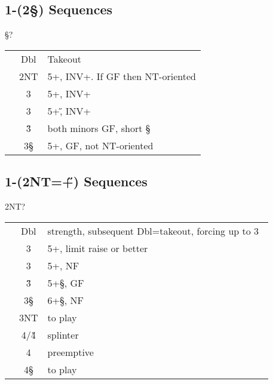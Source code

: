 \subsection{1\D-(2\S) Sequences}

\begin{bidding}
\>\D{}\S\>?
\end{bidding}

\begin{longtable}{C{\linklength} C{\bidlength} l}
& Dbl & Takeout \\
& 2NT & 5+\C, INV+. If GF then NT-oriented \\
& 3\C & 5+\D, INV+ \\
& 3\D & 5+\H, INV+ \\
& 3\H & both minors GF, short \S \\
& 3\S & 5+\C, GF, not NT-oriented \\
\end{longtable}

\subsection{1\D-(2NT=\H+\C) Sequences}

\begin{bidding}
\>\D\>2NT\>?
\end{bidding}

\begin{longtable}{C{\linklength} C{\bidlength} l}
& Dbl & strength, subsequent Dbl=takeout, forcing up to 3\D\ \\
& 3\C & 5+\D, limit raise or better \\
& 3\D & 5+\D, NF \\
& 3\H & 5+\S, GF \\
& 3\S & 6+\S, NF \\
& 3NT & to play \\
& 4\C/4\H & splinter \\
& 4\D & preemptive \\
& 4\S & to play \\
\end{longtable}
